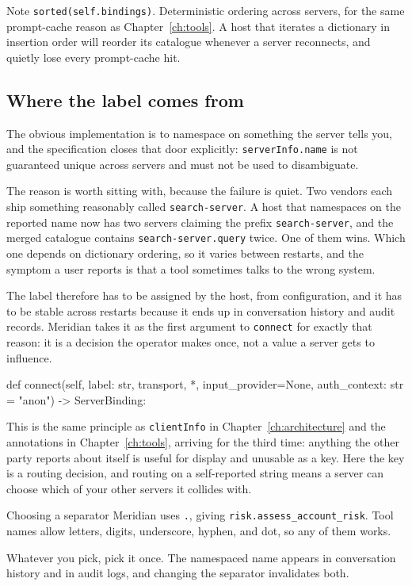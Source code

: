 Note \texttt{sorted(self.bindings)}. Deterministic ordering across servers, for
the same prompt-cache reason as Chapter~\ref{ch:tools}. A host that iterates a
dictionary in insertion order will reorder its catalogue whenever a server
reconnects, and quietly lose every prompt-cache hit.

\subsection{Where the label comes from}

The obvious implementation is to namespace on something the server tells you,
and the specification closes that door explicitly: \texttt{serverInfo.name} is
not guaranteed unique across servers and must not be used to disambiguate.

The reason is worth sitting with, because the failure is quiet. Two vendors each
ship something reasonably called \texttt{search-server}. A host that namespaces
on the reported name now has two servers claiming the prefix
\texttt{search-server}, and the merged catalogue contains
\texttt{search-server.query} twice. One of them wins. Which one depends on
dictionary ordering, so it varies between restarts, and the symptom a user
reports is that a tool sometimes talks to the wrong system.

The label therefore has to be assigned by the host, from configuration, and it
has to be stable across restarts because it ends up in conversation history and
audit records. Meridian takes it as the first argument to \texttt{connect} for
exactly that reason: it is a decision the operator makes once, not a value a
server gets to influence.

\begin{py}
def connect(self, label: str, transport, *, input_provider=None,
            auth_context: str = "anon") -> ServerBinding:
\end{py}

This is the same principle as \texttt{clientInfo} in
Chapter~\ref{ch:architecture} and the annotations in
Chapter~\ref{ch:tools}, arriving for the third time: anything the other party
reports about itself is useful for display and unusable as a key. Here the key
is a routing decision, and routing on a self-reported string means a server can
choose which of your other servers it collides with.

\begin{notebox}{Choosing a separator}
Meridian uses \texttt{.}, giving \texttt{risk.assess\_account\_risk}. Tool names
allow letters, digits, underscore, hyphen, and dot, so any of them works.

Whatever you pick, pick it once. The namespaced name appears in conversation
history and in audit logs, and changing the separator invalidates both.
\end{notebox}

